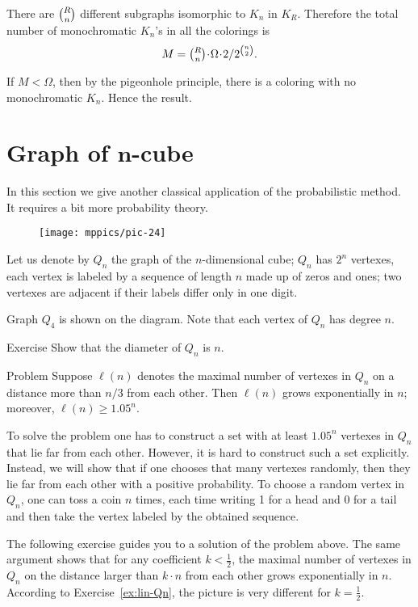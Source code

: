 There are $\tbinom Rn$ different subgraphs isomorphic to $K_n$ in $K_R$.
Therefore the total number of monochromatic $K_n$'s in all the colorings 
is 
\[M=\tbinom Rn\cdot\Omega\cdot  2/2^{\binom n2}.\]

If $M<\Omega$, then by the pigeonhole principle,
there is a coloring with no monochromatic $K_n$.
Hence the result.
\qeds

\section*{Graph of $\bm{n}$-cube}

In this section we give another classical application of the probabilistic method.
It requires a bit more probability theory. 

\begin{wrapfigure}{o}{25mm}
\vskip-0mm
\centering
\texttt{[image: mppics/pic-24]}
\vskip-0mm
\end{wrapfigure}

Let us denote by $Q_n$ the graph of the $n$-dimensional cube;
$Q_n$ has $2^n$ vertexes, each vertex is labeled by a sequence of length $n$ made up of zeros and ones;
two vertexes are adjacent if their labels differ only in one digit.

Graph $Q_4$ is shown on the diagram.
Note that each vertex of $Q_n$ has degree $n$.


\begin{thm}{Exercise}
Show that the diameter of $Q_n$ is $n$. 
\end{thm}


\begin{thm}{Problem}\label{prob:Qn}
Suppose $\ell(n)$ denotes the maximal number of vertexes in $Q_n$ on a distance more than $n/3$ from each other.
Then $\ell(n)$ grows exponentially in $n$;
moreover, $\ell(n)\ge 1.05^n$. 
\end{thm}

To solve the problem one has to construct a set with at least $1.05^n$ vertexes in $Q_n$ that lie far from each other.
However, it is hard to construct such a set explicitly.
Instead, we will show that if one chooses that many vertexes randomly, then they lie far from each other with a positive probability.
To choose a random vertex in $Q_n$, one can toss a coin $n$ times, each time writing 1 for a head and 0 for a tail and then take the vertex labeled by the obtained sequence.

The following exercise guides you to a solution of the problem above.
The same argument shows that for any coefficient $k<\tfrac12$, the maximal number of vertexes in $Q_n$ on the distance larger than $k\cdot n$ from each other grows exponentially in $n$.
According to Exercise~\ref{ex:lin-Qn}, the picture is very different for $k= \tfrac12$.

